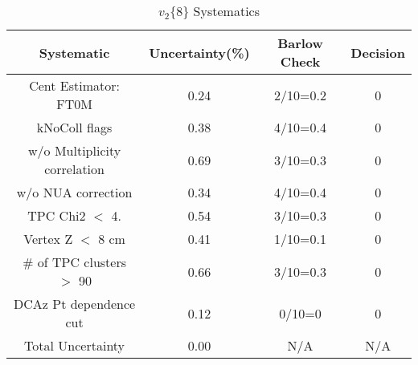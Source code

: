 \begin{table}[htbp]
\caption{$v_2\{8\}$ Systematics}
\label{tab:Sys_v28}
\centering
\begin{tabular}{|c|c|c|c|}
\hline
Systematic & Uncertainty(\%) & Barlow Check & Decision \\
\hline
Cent Estimator: FT0M & 0.24 & 2/10=0.2 & 0 \\
kNoColl flags & 0.38 & 4/10=0.4 & 0 \\
w/o Multiplicity correlation & 0.69 & 3/10=0.3 & 0 \\
w/o NUA correction & 0.34 & 4/10=0.4 & 0 \\
TPC Chi2 $<$ 4. & 0.54 & 3/10=0.3 & 0 \\
Vertex Z $<$ 8 cm & 0.41 & 1/10=0.1 & 0 \\
\# of TPC clusters $>$ 90 & 0.66 & 3/10=0.3 & 0 \\
DCAz Pt dependence cut & 0.12 & 0/10=0 & 0 \\
\hline
Total Uncertainty & 0.00 & N/A & N/A \\
\hline
\end{tabular}
\end{table}
